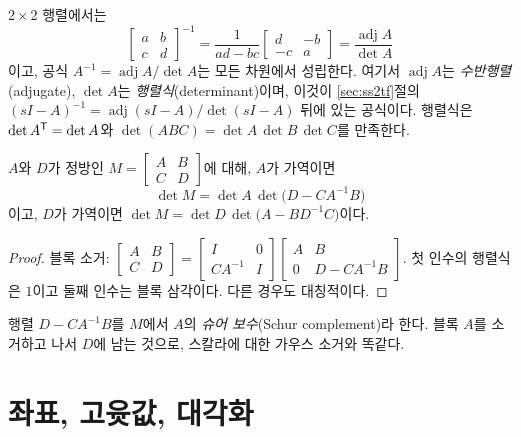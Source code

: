 \documentclass[11pt]{article}
\begin{document}
$2\times2$ 행렬에서는
\[
   \begin{bmatrix}a&b\\c&d\end{bmatrix}^{-1}
   = \frac{1}{ad-bc}\begin{bmatrix}d&-b\\-c&a\end{bmatrix}
   = \frac{\operatorname{adj}A}{\det A}
\]
이고, 공식 $A^{-1}=\operatorname{adj}A/\det A$는 모든 차원에서 성립한다. 여기서
$\operatorname{adj}A$는 \emph{수반행렬}(adjugate), $\det A$는
\emph{행렬식}(determinant)이며, 이것이 \ref{sec:ss2tf}절의
$(sI-A)^{-1}=\operatorname{adj}(sI-A)/\det(sI-A)$ 뒤에 있는 공식이다. 행렬식은
$\det A^{\mathsf{T}}=\det A$와 $\det(ABC)=\det A\,\det B\,\det C$를 만족한다.

\begin{proposition}[슈어 보수]\label{prop:schur}
$A$와 $D$가 정방인 $M=\begin{bmatrix}A&B\\C&D\end{bmatrix}$에 대해, $A$가
가역이면
\[
   \det M = \det A\,\det\bigl(D-CA^{-1}B\bigr)
\]
이고, $D$가 가역이면 $\det M=\det D\,\det\bigl(A-BD^{-1}C\bigr)$이다.
\end{proposition}
\begin{proof}
블록 소거: $\begin{bmatrix}A&B\\C&D\end{bmatrix}
=\begin{bmatrix}I&0\\CA^{-1}&I\end{bmatrix}
\begin{bmatrix}A&B\\0&D-CA^{-1}B\end{bmatrix}$. 첫 인수의 행렬식은 $1$이고 둘째
인수는 블록 삼각이다. 다른 경우도 대칭적이다.
\end{proof}
행렬 $D-CA^{-1}B$를 $M$에서 $A$의 \emph{슈어 보수}(Schur complement)라 한다. 블록
$A$를 소거하고 나서 $D$에 남는 것으로, 스칼라에 대한 가우스 소거와 똑같다.

\section{좌표, 고윳값, 대각화}\label{sec:eigen}
\end{document}
